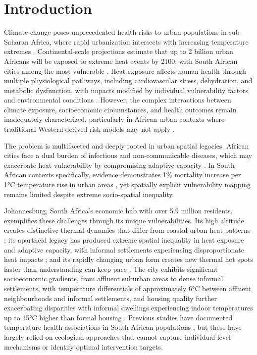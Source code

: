 \documentclass[11pt,a4paper]{article}
\begin{document}
\doublespacing
\linenumbers

\section{Introduction}

Climate change poses unprecedented health risks to urban populations in sub-Saharan Africa, where rapid urbanization intersects with increasing temperature extremes \cite{watts2021lancet,romanello2022lancet}. Continental-scale projections estimate that up to 2 billion urban Africans will be exposed to extreme heat events by 2100, with South African cities among the most vulnerable \cite{fotsonguemo2023projected}. Heat exposure affects human health through multiple physiological pathways, including cardiovascular stress, dehydration, and metabolic dysfunction, with impacts modified by individual vulnerability factors and environmental conditions \cite{hajek2022heat,li2022heat}. However, the complex interactions between climate exposure, socioeconomic circumstances, and health outcomes remain inadequately characterized, particularly in African urban contexts where traditional Western-derived risk models may not apply \cite{robinson2021african}.

The problem is multifaceted and deeply rooted in urban spatial legacies. African cities face a dual burden of infectious and non-communicable diseases, which may exacerbate heat vulnerability by compromising adaptive capacity \cite{khine2023implications,manyuchi2022extreme}. In South African contexts specifically, evidence demonstrates 1\% mortality increase per 1°C temperature rise in urban areas \cite{scovronick2018association,wichmann2017heat}, yet spatially explicit vulnerability mapping remains limited despite extreme socio-spatial inequality.

Johannesburg, South Africa's economic hub with over 5.9 million residents, exemplifies these challenges through its unique vulnerabilities. Its high altitude creates distinctive thermal dynamics that differ from coastal urban heat patterns \cite{naicker2017indoor}; its apartheid legacy has produced extreme spatial inequality in heat exposure and adaptive capacity, with informal settlements experiencing disproportionate heat impacts \cite{strauss2019historical,ansah2024climate}; and its rapidly changing urban form creates new thermal hot spots faster than understanding can keep pace \cite{simwanda2019spatial}. The city exhibits significant socioeconomic gradients, from affluent suburban areas to dense informal settlements, with temperature differentials of approximately 6°C between affluent neighbourhoods and informal settlements, and housing quality further exacerbating disparities with informal dwellings experiencing indoor temperatures up to 15°C higher than formal housing \cite{naicker2017indoor,souverijns2022urban}. Previous studies have documented temperature-health associations in South African populations \cite{wright2014human,wichmann2017heat}, but these have largely relied on ecological approaches that cannot capture individual-level mechanisms or identify optimal intervention targets.
\end{document}
